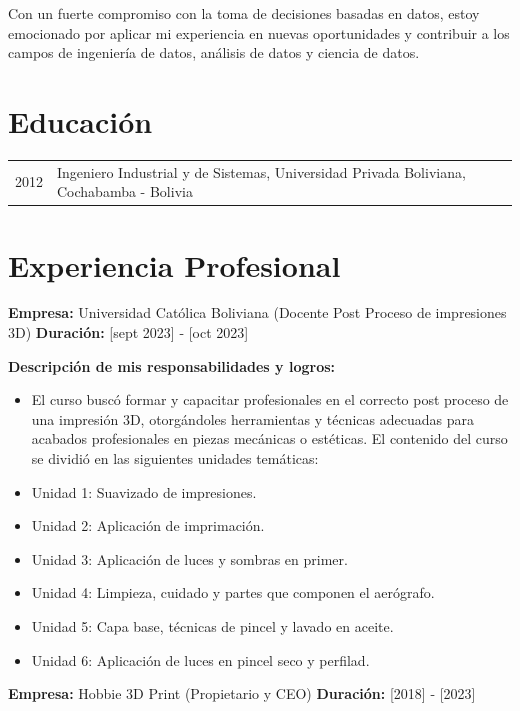 \documentclass[a4paper,10pt]{article}
\begin{document}
Con un fuerte compromiso con la toma de decisiones basadas en datos, estoy emocionado por aplicar mi experiencia en nuevas oportunidades y contribuir a los campos de ingeniería de datos, análisis de datos y ciencia de datos.

\section*{Educación}
\begin{tabular}{p{3cm}p{12cm}}
    2012 & Ingeniero Industrial y de Sistemas, Universidad Privada Boliviana, Cochabamba - Bolivia \\
\end{tabular}

\section*{Experiencia Profesional}

\textbf{Empresa:} Universidad Católica Boliviana (Docente Post Proceso de impresiones 3D)  
\textbf{Duración:} [sept 2023] - [oct 2023]

\textbf{Descripción de mis responsabilidades y logros:}
\begin{itemize}
    \item El curso buscó formar y capacitar profesionales en el correcto post proceso de una impresión 3D, otorgándoles herramientas y técnicas adecuadas para acabados profesionales en piezas mecánicas o estéticas. El contenido del curso se dividió en las siguientes unidades temáticas:
    \item Unidad 1: Suavizado de impresiones.
    \item Unidad 2: Aplicación de imprimación.
    \item Unidad 3: Aplicación de luces y sombras en primer.
    \item Unidad 4: Limpieza, cuidado y partes que componen el aerógrafo.
    \item Unidad 5: Capa base, técnicas de pincel y lavado en aceite.
    \item Unidad 6: Aplicación de luces en pincel seco y perfilad.

\end{itemize}
\vspace{15pt} %
\textbf{Empresa:} Hobbie 3D Print (Propietario y CEO)  
\textbf{Duración:} [2018] - [2023]
\end{document}
